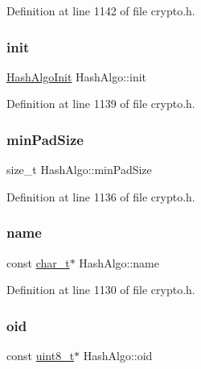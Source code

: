 Definition at line 1142 of file crypto.\+h.

\mbox{\label{structHashAlgo_a77dcebcb5fd49cd6672ad6c97b55fdee}} 
\subsubsection{\texorpdfstring{init}{init}}
{\footnotesize\ttfamily \hyperlink{cyclone__crypto_2core_2crypto_8h_afc5ce55917bd80825aa610848f402caf}{Hash\+Algo\+Init} Hash\+Algo\+::init}



Definition at line 1139 of file crypto.\+h.

\mbox{\label{structHashAlgo_ac9d6aa5a36049d667037f67b2fdb4c15}} 
\subsubsection{\texorpdfstring{min\+Pad\+Size}{minPadSize}}
{\footnotesize\ttfamily size\+\_\+t Hash\+Algo\+::min\+Pad\+Size}



Definition at line 1136 of file crypto.\+h.

\mbox{\label{structHashAlgo_ab81a05d05e3730f55ce4a4b1036f4468}} 
\subsubsection{\texorpdfstring{name}{name}}
{\footnotesize\ttfamily const \hyperlink{compiler__port_8h_a40bb5262bf908c328fbcfbe5d29d0201}{char\+\_\+t}$\ast$ Hash\+Algo\+::name}



Definition at line 1130 of file crypto.\+h.

\mbox{\label{structHashAlgo_a19af95385f1c3b7f8ccbe17bc078b673}} 
\subsubsection{\texorpdfstring{oid}{oid}}
{\footnotesize\ttfamily const \hyperlink{stdint_8h_aba7bc1797add20fe3efdf37ced1182c5}{uint8\+\_\+t}$\ast$ Hash\+Algo\+::oid}



